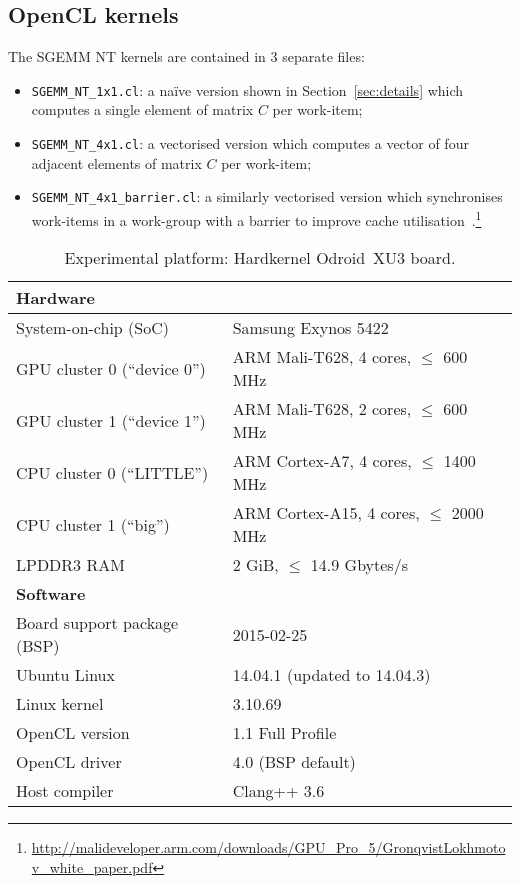 \documentclass{acm_proc_article-sp} %
\begin{document}
\subsection{OpenCL kernels}

The SGEMM NT kernels are contained in 3 separate files:
%
\begin{itemize}

  \item \verb|SGEMM_NT_1x1.cl|: a na\"ive version shown in
  Section~\ref{sec:details} which computes a single element of matrix $C$ per
  work-item;

  \item \verb|SGEMM_NT_4x1.cl|: a vectorised version which computes a vector of
  four adjacent elements of matrix $C$ per work-item;

  \item \verb|SGEMM_NT_4x1_barrier.cl|: a similarly vectorised version which
  synchronises work-items in a work-group with a barrier to improve cache
  utilisation~\cite{Gronqvist:2014}.\footnote{\url{http://malideveloper.arm.com/downloads/GPU_Pro_5/GronqvistLokhmotov_white_paper.pdf}}

\end{itemize}
%

\begin{table*}
\centering
\caption{\label{Odroid}Experimental platform: Hardkernel Odroid~XU3 board.}
\begin{tabular}{ll}
\toprule
{\bf Hardware}   &\\
\midrule
System-on-chip (SoC)         & Samsung Exynos 5422                     \\
GPU cluster 0 (``device 0'') & ARM Mali-T628,  4 cores, $\le$ 600 MHz  \\
GPU cluster 1 (``device 1'') & ARM Mali-T628,  2 cores, $\le$ 600 MHz  \\
CPU cluster 0 (``LITTLE'')   & ARM Cortex-A7,  4 cores, $\le$ 1400 MHz \\
CPU cluster 1 (``big'')      & ARM Cortex-A15, 4 cores, $\le$ 2000 MHz \\
LPDDR3 RAM                   & 2 GiB, $\le$ 14.9 Gbytes/s              \\
\midrule
{\bf Software}   &\\
\midrule
Board support package (BSP)  & 2015-02-25                    \\
Ubuntu Linux                 & 14.04.1 (updated to 14.04.3)  \\
Linux kernel                 & 3.10.69                       \\
OpenCL version               & 1.1 Full Profile              \\
OpenCL driver                & 4.0 (BSP default)             \\
Host compiler                & Clang++ 3.6                   \\
\bottomrule
\end{tabular}
\end{table*}
\end{document}
